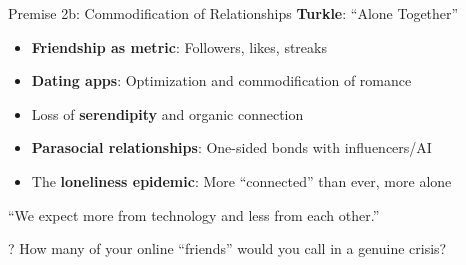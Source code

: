 \documentclass[aspectratio=169]{beamer}
\begin{document}
\begin{frame}{Premise 2b: Commodification of Relationships}
\textbf{Turkle}: ``Alone Together''

\begin{itemize}
    \item \textbf{Friendship as metric}: Followers, likes, streaks
    \item \textbf{Dating apps}: Optimization and commodification of romance
    \item Loss of \textbf{serendipity} and organic connection
    \item \textbf{Parasocial relationships}: One-sided bonds with influencers/AI
    \item The \textbf{loneliness epidemic}: More ``connected'' than ever, more alone
\end{itemize}

\vspace{0.3cm}
\begin{quotebox}
``We expect more from technology and less from each other.''
\end{quotebox}

\begin{alertblock}{?}
How many of your online ``friends'' would you call in a genuine crisis?
\end{alertblock}
\end{frame}
\end{document}
